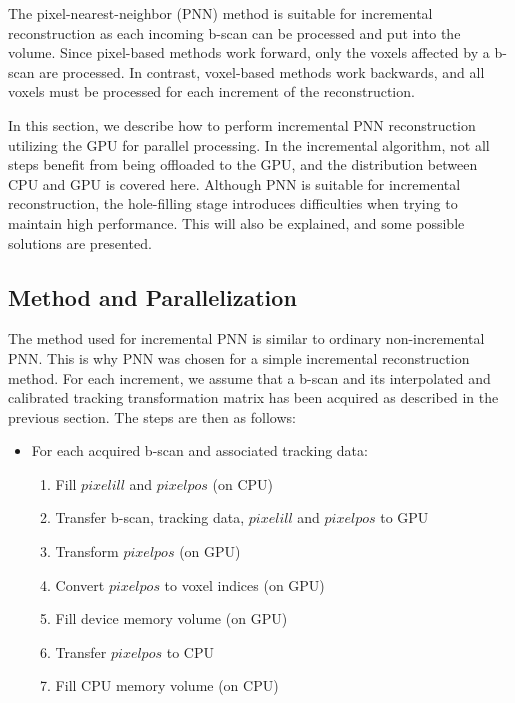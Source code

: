 The pixel-nearest-neighbor (PNN) method is suitable for incremental reconstruction as each incoming b-scan can be processed and put into the volume. Since pixel-based methods work forward, only the voxels affected by a b-scan are processed. In contrast, voxel-based methods work backwards, and all voxels must be processed for each increment of the reconstruction.

In this section, we describe how to perform incremental PNN reconstruction utilizing the GPU for parallel processing. In the incremental algorithm, not all steps benefit from being offloaded to the GPU, and the distribution between CPU and GPU is covered here. Although PNN is suitable for incremental reconstruction, the hole-filling stage introduces difficulties when trying to maintain high performance. This will also be explained, and some possible solutions are presented.

\subsection{Method and Parallelization}

The method used for incremental PNN is similar to ordinary non-incremental PNN. This is why PNN was chosen for a simple incremental reconstruction method. For each increment, we assume that a b-scan and its interpolated and calibrated tracking transformation matrix has been acquired as described in the previous section. The steps are then as follows:

\begin{itemize}
	\item For each acquired b-scan and associated tracking data:
	\begin{enumerate}
		\item Fill $pixelill$ and $pixelpos$ (on CPU)
		\item Transfer b-scan, tracking data, $pixelill$ and $pixelpos$ to GPU
		\item Transform $pixelpos$ (on GPU)
		\item Convert $pixelpos$ to voxel indices (on GPU)
		\item Fill device memory volume (on GPU)
		\item Transfer $pixelpos$ to CPU
		\item Fill CPU memory volume (on CPU)
	\end{enumerate}
\end{itemize}

